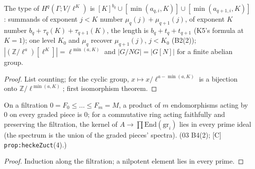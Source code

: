 \begin{lemma}\label{inf:heckez-types}
  \leanok
  The type of $H^q(\Gamma;V/\ell^K)$ is $[K]^{b_q}\cup[\min(a_{q,i},K)]\cup[\min(a_{q+1,i},K)]$: summands of exponent $j<K$ number
  $\mu_q(j)+\mu_{q+1}(j)$, of exponent $K$ number $b_q+\tau_q(K)+\tau_{q+1}(K)$, the length is $b_q+t_q+t_{q+1}$ (K5's formula at $K=1$); one level
  $K_0$ and $\mu_q$ recover $\mu_{q+1}(j)$, $j<K_0$ (B2(2)); $|(\mathbb Z/\ell^a)[\ell^K]|=\ell^{\min(a,K)}$ and $|G/NG|=|G[N]|$ for a finite abelian group.
\end{lemma}
\begin{proof}
  \leanok
  List counting; for the cyclic group, $x\mapsto x/\ell^{a-\min(a,K)}$ is a bijection onto $\mathbb Z/\ell^{\min(a,K)}$; first isomorphism theorem.
\end{proof}

\begin{lemma}\label{inf:heckez-filt}
  \leanok
  On a filtration $0=F_0\le\dots\le F_m=M$, a product of $m$ endomorphisms acting by $0$ on every graded piece is $0$; for a commutative ring acting
  faithfully and preserving the filtration, the kernel of $A\to\prod\mathrm{End}(\mathrm{gr}_i)$ lies in every prime ideal (the spectrum is the union of
  the graded pieces' spectra). (03 B4(2); [C] \texttt{prop:heckeZuct}(4).)
\end{lemma}
\begin{proof}
  \leanok
  Induction along the filtration; a nilpotent element lies in every prime.
\end{proof}

